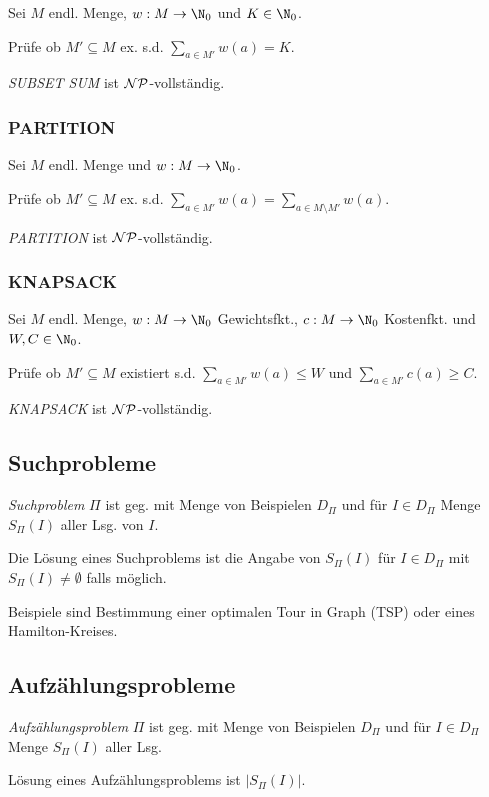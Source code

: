 Sei $M$ endl. Menge, $w : M \to \N_0$ und $K \in \N_0$.

Prüfe ob $M' \subseteq M$ ex. s.d. $\sum_{a \in M'} w(a) = K$.

\emph{SUBSET SUM} ist $\mathcal{NP}$-vollständig.

\subsubsection*{PARTITION}

Sei $M$ endl. Menge und $w : M \to \N_0$.

Prüfe ob $M' \subseteq M$ ex. s.d. $\textstyle\sum\limits_{a \in M'} w(a) = \textstyle\sum\limits_{a \in M \setminus M'} w(a)$.

\emph{PARTITION} ist $\mathcal{NP}$-vollständig.

\subsubsection*{KNAPSACK}

Sei $M$ endl. Menge, $w : M \to \N_0$ Gewichtsfkt., $c : M \to \N_0$ Kostenfkt. und $W,C \in \N_0$.

Prüfe ob $M' \subseteq M$ existiert s.d. $\sum_{a \in M'} w(a) \leq W$ und $\sum_{a \in M'} c(a) \geq C$.

\emph{KNAPSACK} ist $\mathcal{NP}$-vollständig.

\subsection*{Suchprobleme}

\emph{Suchproblem} $\Pi$ ist geg. mit Menge von Beispielen $D_\Pi$ und für $I \in D_\Pi$ Menge $S_\Pi(I)$ aller Lsg. von $I$.

Die Lösung eines Suchproblems ist die Angabe von $S_\Pi(I)$ für $I \in D_\Pi$ mit $S_\Pi(I) \neq \emptyset$ falls möglich.

\spacing

Beispiele sind Bestimmung einer optimalen Tour in Graph (TSP) oder eines Hamilton-Kreises.

\subsection*{Aufzählungsprobleme}

\emph{Aufzählungsproblem} $\Pi$ ist geg. mit Menge von Beispielen $D_\Pi$ und für $I \in D_\Pi$ Menge $S_\Pi(I)$ aller Lsg.

Lösung eines Aufzählungsproblems ist $|S_\Pi(I)|$.

